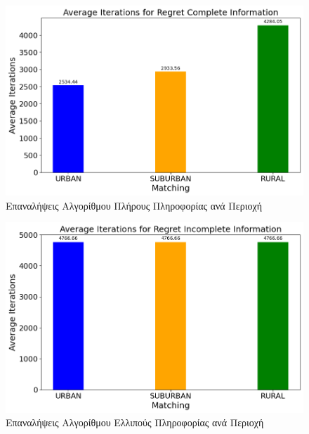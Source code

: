 \begin{figure}[H]
    \centering
    \includegraphics[width=\textwidth]{figures/chapter4/Average_Iterations_per_area_RCI.png}
    \caption{Επαναλήψεις Αλγορίθμου Πλήρους Πληροφορίας ανά Περιοχή}
    \label{fig41}
\end{figure}

\newpage

\begin{figure}[H]
    \centering
    \includegraphics[width=\textwidth]{figures/chapter4/Average_Iterations_per_area_RII.png}
    \caption{Επαναλήψεις Αλγορίθμου Ελλιπούς Πληροφορίας ανά Περιοχή}
    \label{fig42}
\end{figure}

